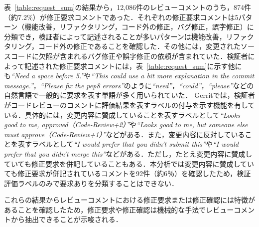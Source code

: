 \documentclass[11pt]{jreport}
\begin{document}
表~\ref{table:request_sum}の結果から，12,086件のレビューコメントのうち，874件（約7.2\%）が修正要求コメントであった．それぞれの修正要求コメントは5パターン（機能改善，リファクタリング，コード外の修正，バグ修正，誤字修正）に分類でき，検証者によって記述されることが多いパターンは機能改善，リファクタリング，コード外の修正であることを確認した．その他には，変更されたソースコードに欠陥が含まれるバグ修正や誤字修正の依頼が含まれていた．検証者によって記述された修正要求コメントには，表~\ref{table:request_sum}に示す他にも\textit{``Need a space before 5.''}や\textit{``This could use a bit more explanation in the commit message.''}，\textit{``Please fix the pep8 errors''}のように\textit{``need''}，\textit{``could''}，\textit{``please''}などの自然言語で一般的に要求を表す単語が多く用いられていた．
Gerritでは，検証者がコードレビューのコメントに評価結果を表すラベルの付与を示す機能を有している．具体的には，変更内容に賛成していることを表すラベルとして\textit{``Looks good to me, approved（Code-Review+2）''}や\textit{``Looks good to me, but someone else must approve（Code-Review+1）''}などがある．また，変更内容に反対していることを表すラベルとして\textit{``I would prefer that you didn't submit this''}や\textit{``I would prefer that you didn't merge this''}などがある．ただし，たとえ変更内容に賛成していても修正要求を併記していることもある．本分析では変更内容に賛成していても修正要求が併記されているコメントを92件（約6％）を確認したため，検証評価ラベルのみで要求ありを分類することはできない．

これらの結果からレビューコメントにおける修正要求または修正確認には特徴があることを確認したため，修正要求や修正確認は機械的な手法でレビューコメントから抽出できることが示唆される．

\begin{table}[t]
\centering
  \caption{修正要求に含まれていた内容}
  \label{table:request_sum}
\end{table}
\end{document}
